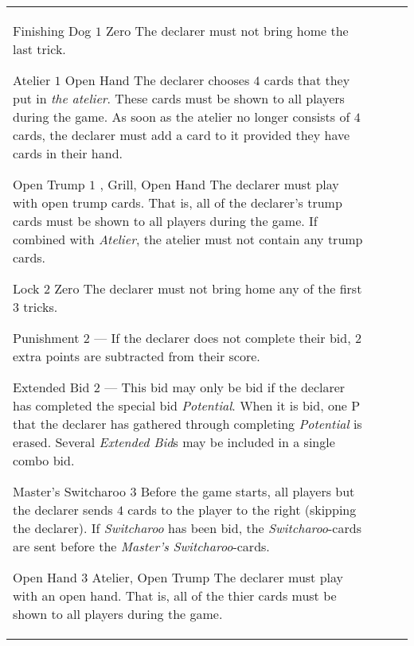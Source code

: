 \begin{table}
\begin{center}
\begin{tabularx}{\textwidth}{lcp{3cm}|X}
			\specialBidItem%
			{Finishing Dog}
			{$1$}
			{Zero}
			{%
				The declarer must not bring home the last trick.
			}

			\specialBidItem%
			{Atelier}
			{$1$}
			{Open Hand}
			{%
				The declarer chooses $4$ cards that they put in \emph{the atelier}. These cards must be shown to all players during the game. As soon as the atelier no longer consists of $4$ cards, the declarer must add a card to it provided they have cards in their hand.
			}

			\specialBidItem%
			{Open Trump}
			{$1$}
			{\nonTrump, Grill, Open Hand}
			{%
				The declarer must play with open trump cards. That is, all of the declarer’s trump cards must be shown to all players during the game. If combined with \emph{Atelier}, the atelier must not contain any trump cards.
			}

			\specialBidItem%
			{Lock}
			{$2$}
			{Zero}
			{%
				The declarer must not bring home any of the first $3$ tricks.
			}

			\specialBidItem%
			{Punishment}
			{$2$}
			{---}
			{%
				If the declarer does not complete their bid, $2$ extra points are subtracted from their score.
			}

			\specialBidItem%
			{Extended Bid}
			{$2$}
			{---}
			{%
				This bid may only be bid if the declarer has completed the special bid \emph{Potential}. When it is bid, one P that the declarer has gathered through completing \emph{Potential} is erased. Several \emph{Extended Bid}s may be included in a single combo bid.
			}

			\specialBidItem%
			{Master's Switcharoo}
			{$3$}
			{\nonTrump}
			{%
				Before the game starts, all players but the declarer sends $4$ cards to the player to the right (skipping the declarer). If \emph{Switcharoo} has been bid, the \emph{Switcharoo}-cards are sent before the \emph{Master's Switcharoo}-cards.
			}

			\specialBidItem%
			{Open Hand}
			{$3$}
			{Atelier, Open Trump}
			{%
				The declarer must play with an open hand. That is, all of the thier cards must be shown to all players during the game.
			}
		\end{tabularx}
	\end{center}
\end{table}
